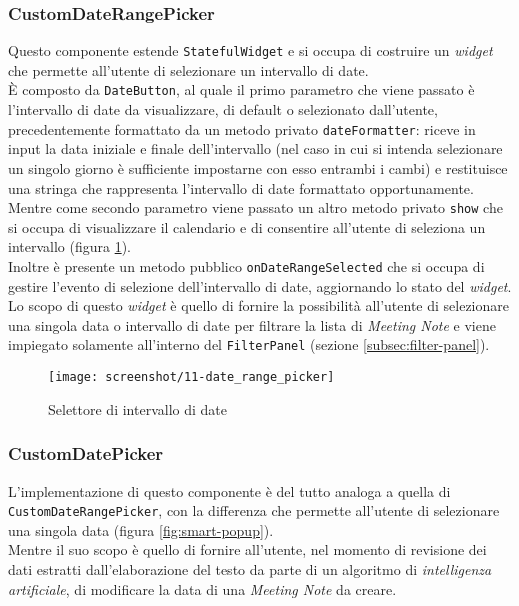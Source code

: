 \subsubsection*{CustomDateRangePicker}
\label{subsubsec:custom-date-range-picker}

Questo componente estende \lstinline{StatefulWidget} e si occupa di costruire un \emph{widget} che permette all'utente di selezionare un intervallo di date.\\
È composto da \lstinline{DateButton}, al quale il primo parametro che viene passato è l'intervallo di date da visualizzare, di default o selezionato dall'utente, precedentemente formattato da un metodo privato \lstinline{dateFormatter}: riceve in input la data iniziale e finale dell'intervallo (nel caso in cui si intenda selezionare un singolo giorno è sufficiente impostarne con esso entrambi i cambi) e restituisce una stringa che rappresenta l'intervallo di date formattato opportunamente.\\
Mentre come secondo parametro viene passato un altro metodo privato \lstinline{show} che si occupa di visualizzare il calendario e di consentire all'utente di seleziona un intervallo (figura \ref{fig:date-range-picker}). \\
Inoltre è presente un metodo pubblico \lstinline{onDateRangeSelected} che si occupa di gestire l'evento di selezione dell'intervallo di date, aggiornando lo stato del \emph{widget}. \\
Lo scopo di questo \emph{widget} è quello di fornire la possibilità all'utente di selezionare una singola data o intervallo di date per filtrare la lista di \emph{Meeting Note} e viene impiegato solamente all'interno del \lstinline{FilterPanel} (sezione \ref{subsec:filter-panel}).

\begin{figure}[!h] 
    \centering 
    \texttt{[image: screenshot/11-date\_range\_picker]} 
    \caption{Selettore di intervallo di date}
    \label{fig:date-range-picker}
\end{figure}

\subsubsection*{CustomDatePicker}
\label{subsubsec:custom-date-picker}

L'implementazione di questo componente è del tutto analoga a quella di \lstinline{CustomDateRangePicker}, con la differenza che permette all'utente di selezionare una singola data (figura \ref{fig:smart-popup}).\\
Mentre il suo scopo è quello di fornire all'utente, nel momento di revisione dei dati estratti dall'elaborazione del testo da parte di un algoritmo di \emph{intelligenza artificiale}, di modificare la data di una \emph{Meeting Note} da creare.

